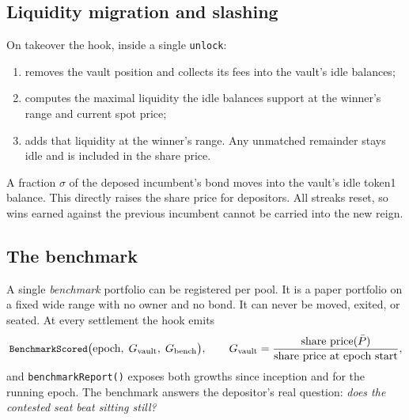 \documentclass[11pt,a4paper]{article}
\newcommand{\code}[1]{\texttt{\small #1}}
\begin{document}
\subsection{Liquidity migration and slashing}
On takeover the hook, inside a single \code{unlock}:
\begin{enumerate}
  \item removes the vault position and collects its fees into the vault's idle balances;
  \item computes the maximal liquidity the idle balances support at the winner's range and current spot price;
  \item adds that liquidity at the winner's range. Any unmatched remainder stays idle and is included in the share price.
\end{enumerate}
A fraction $\sigma$ of the deposed incumbent's bond moves into the vault's idle token1 balance. This directly raises the share price for depositors. All streaks reset, so wins earned against the previous incumbent cannot be carried into the new reign.

\subsection{The benchmark}
A single \emph{benchmark} portfolio can be registered per pool. It is a paper portfolio on a fixed wide range with no owner and no bond. It can never be moved, exited, or seated. At every settlement the hook emits
\[
  \code{BenchmarkScored}\big(\text{epoch},\; G_{\text{vault}},\; G_{\text{bench}}\big),
  \qquad G_{\text{vault}} = \frac{\text{share price}(\bar P)}{\text{share price at epoch start}},
\]
and \code{benchmarkReport()} exposes both growths since inception and for the running epoch. The benchmark answers the depositor's real question: \emph{does the contested seat beat sitting still?}
\end{document}
